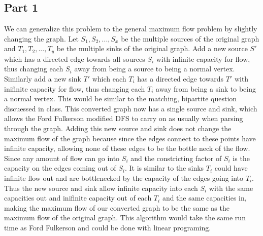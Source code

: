 \documentclass[11pt]{article}
\begin{document}
\subsection*{Part 1}
We can generalize this problem to the general maximum flow problem by slightly changing the graph. Let $S_1, S_2, ..., S_x$ be the multiple sources of the original graph and $T_1, T_2, ..., T_y$ be the multiple sinks of the original graph. Add a new source $S'$ which has a directed edge towards all sources $S_i$ with infinite capacity for flow, thus changing each $S_i$ away from being a source to being a normal vertex. Similarly add a new sink $T'$ which each $T_i$ has a directed edge towards $T'$ with inifinite capacity for flow, thus changing each $T_i$ away from being a sink to being a normal vertex. This would be similar to the matching, bipartite question discuessed in class. This converted graph now has a single source and sink, which allows the Ford Fulkerson modified DFS to carry on as usually when parsing through the graph. Adding this new source and sink does not change the maximum flow of the graph because since the edges connect to these points have infinite capacity, allowing none of these edges to be the bottle neck of the flow. Since any amount of flow can go into $S_i$ and the constricting factor of $S_i$ is the capacity on the edges coming out of $S_i$. It is similar to the sinks $T_i$ could have infinite flow out and are bottlenecked by the capacity of the edges going into $T_i$. Thus the new source and sink allow infinite capacity into each $S_i$ with the same capacities out and inifinite capacity out of each $T_i$  and the same capacities in, making the maximum flow of our converted graph to be the same as the maximum flow of the original graph. This algorithm would take the same run time as Ford Fulkerson and could be done with linear programing.
\end{document}

